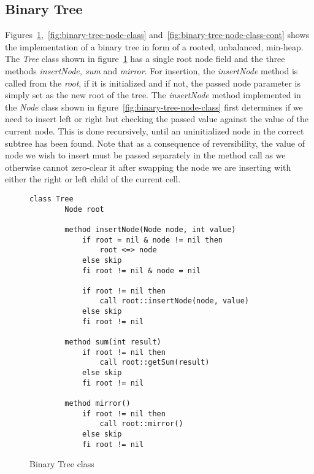 \subsection{Binary Tree}
\label{subsec:binary-tree}
Figures~\ref{fig:binary-tree-class},~\ref{fig:binary-tree-node-class} and~\ref{fig:binary-tree-node-class-cont} shows the implementation of a binary tree in form of a  rooted, unbalanced, min-heap. The \textit{Tree} class shown in figure~\ref{fig:binary-tree-class} has a single root node field and the three methods \textit{insertNode, sum} and \textit{mirror}. For insertion, the \textit{insertNode} method is called from the \textit{root}, if it is initialized and if not, the passed node parameter is simply set as the new root of the tree. The \textit{insertNode} method implemented in the \textit{Node} class shown in figure~\ref{fig:binary-tree-node-class} first determines if we need to insert left or right but checking the passed value against the value of the current node. This is done recursively, until an uninitialized node in the correct subtree has been found. Note that as a consequence of reversibility, the value of node we wish to insert must be passed separately in the method call as we otherwise cannot zero-clear it after swapping the node we are inserting with either the right or left child of the current cell.

\begin{figure}[ht!]
    \centering
    \begin{lstlisting}[style = basic, language = roopl] 
    class Tree
        Node root
        
        method insertNode(Node node, int value)
            if root = nil & node != nil then
                root <=> node
            else skip
            fi root != nil & node = nil
    
            if root != nil then
                call root::insertNode(node, value)
            else skip
            fi root != nil
    
        method sum(int result)
            if root != nil then
                call root::getSum(result)
            else skip
            fi root != nil
    
        method mirror()
            if root != nil then
                call root::mirror()
            else skip
            fi root != nil
    \end{lstlisting}
    \caption{Binary Tree class}
    \label{fig:binary-tree-class}
\end{figure}

